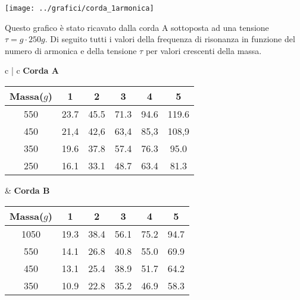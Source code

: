 \begin{center}

\texttt{[image: ../grafici/corda\_1armonica]}
\end{center}
Questo grafico è stato ricavato dalla corda A sottoposta ad una tensione $\tau=g\cdot250g$. Di seguito tutti i valori della frequenza di risonanza in funzione del numero di armonica e della tensione $\tau$ per valori crescenti della massa.

\begin{center}
\begin{tabular}{c   |  c}
\textbf{Corda A }
\begin{tabular}{ c | c | c | c | c | c }
Massa($g$) & 1 & 2 & 3 & 4 & 5\\
\midrule
550 & 23.7 & 45.5 & 71.3 & 94.6 & 119.6\\
450 & 21,4 & 42,6 & 63,4 & 85,3 & 108,9\\
350 & 19.6 & 37.8 & 57.4 & 76.3 & 95.0\\
250 & 16.1 & 33.1 & 48.7 & 63.4 & 81.3 \\
\end{tabular}
&
\textbf{Corda B}
\begin{tabular}{ c | c | c | c | c | c }
Massa($g$) & 1 & 2 & 3 & 4 & 5\\
\midrule
1050 & 19.3 & 38.4 & 56.1 & 75.2 & 94.7 \\
550 & 14.1 & 26.8 & 40.8 & 55.0 & 69.9 \\
450 & 13.1 & 25.4 & 38.9 & 51.7 & 64.2\\
350 & 10.9 & 22.8 & 35.2 & 46.9 & 58.3\\
\end{tabular}

\end{tabular}
\end{center}
